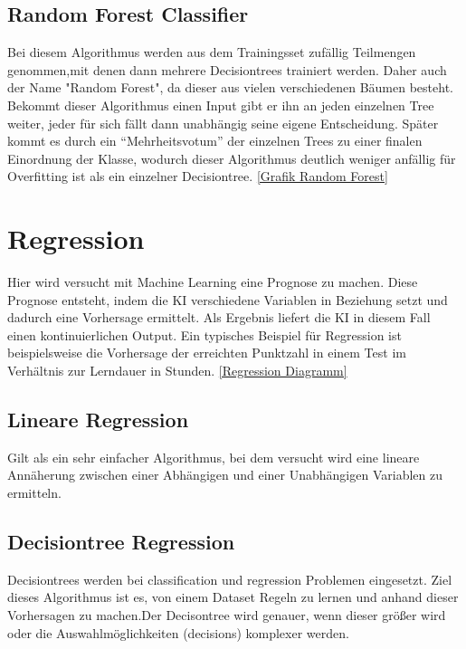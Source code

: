 \subsection{Random Forest Classifier}
\label{sec:RFC}
Bei diesem Algorithmus  werden aus dem Trainingsset zufällig Teilmengen genommen,mit denen dann mehrere Decisiontrees trainiert werden. Daher auch der Name "Random Forest", da dieser aus vielen verschiedenen Bäumen besteht\cite[p.~256]{MB}. Bekommt dieser Algorithmus einen Input gibt er ihn an jeden einzelnen Tree weiter, jeder für sich fällt dann unabhängig seine eigene Entscheidung. Später kommt es durch ein “Mehrheitsvotum” der einzelnen Trees zu einer finalen Einordnung der Klasse, wodurch dieser Algorithmus deutlich weniger anfällig für Overfitting ist als ein einzelner Decisiontree\cite{MED}. \hyperlink{einführungMachineLearning}{[Grafik Random Forest]}

\section{Regression}
\label{sec:regression}
Hier wird versucht mit Machine Learning eine Prognose zu machen. Diese Prognose entsteht, indem die KI verschiedene Variablen in Beziehung setzt und dadurch eine Vorhersage ermittelt. Als Ergebnis liefert die KI in diesem Fall einen kontinuierlichen Output.\cite[p.~4.]{WML}  Ein typisches Beispiel für Regression ist beispielsweise die Vorhersage der erreichten Punktzahl in einem Test im Verhältnis zur Lerndauer in Stunden. \hyperlink{chap:einführungMachineLearning}{[Regression Diagramm]}

\subsection{Lineare Regression}
\label{sec:lineareRegression}
Gilt als ein sehr einfacher Algorithmus, bei dem versucht wird eine lineare Annäherung zwischen einer Abhängigen und einer Unabhängigen Variablen zu ermitteln.\cite[p.~100.]{WML}  


\subsection{Decisiontree Regression}
\label{sec:decisiontreeRegression}
Decisiontrees werden bei classification und regression Problemen eingesetzt. Ziel dieses Algorithmus ist es, von einem Dataset Regeln zu lernen und anhand dieser Vorhersagen zu machen.Der Decisontree wird genauer, wenn dieser größer wird oder die Auswahlmöglichkeiten (decisions) komplexer werden.\cite{SKLT}

